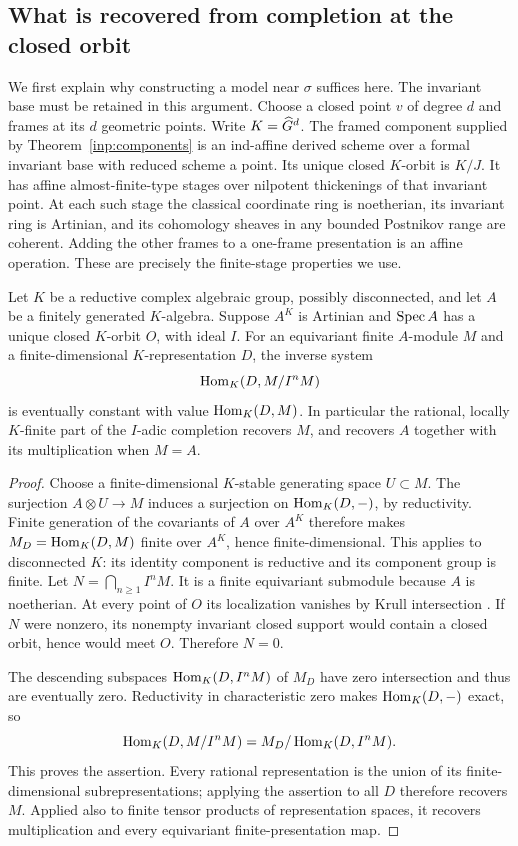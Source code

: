 \subsection{What is recovered from completion at the closed orbit}

We first explain why constructing a model near $\sigma$ suffices here.
The invariant base must be retained in this argument. Choose a closed
point $v$ of degree $d$ and frames at its $d$ geometric points. Write
$K=\widehat G^d$. The framed component supplied by
Theorem~\ref{inp:components} is an ind-affine derived scheme over a
formal invariant base with reduced scheme a point. Its unique closed
$K$-orbit is $K/J$. It has affine almost-finite-type stages over
nilpotent thickenings of that invariant point. At each such stage the
classical coordinate ring is noetherian, its invariant ring is
Artinian, and its cohomology sheaves in any bounded Postnikov range are
coherent. Adding the other frames to a one-frame presentation is an
affine operation. These are precisely the finite-stage properties we
use.

\begin{lemma}
\label{mod:finite-covariants}
Let $K$ be a reductive complex algebraic group, possibly disconnected,
and let $A$ be a finitely generated $K$-algebra. Suppose $A^K$ is
Artinian and $\operatorname{Spec} A$ has a unique closed $K$-orbit $O$, with ideal
$I$. For an equivariant finite $A$-module $M$ and a finite-dimensional
$K$-representation $D$, the inverse system
\[
 \operatorname{Hom}_K(D,M/I^nM)
\]
is eventually constant with value $\operatorname{Hom}_K(D,M)$. In particular the
rational, locally $K$-finite part of the $I$-adic completion recovers
$M$, and recovers $A$ together with its multiplication when $M=A$.
\end{lemma}

\begin{proof}
Choose a finite-dimensional $K$-stable generating space $U\subset M$.
The surjection $A\otimes U\to M$ induces a surjection on
$\operatorname{Hom}_K(D,-)$, by reductivity. Finite generation of the covariants
of $A$ over $A^K$ \cite[Lemma~2.3]{Brion} therefore makes
$M_D=\operatorname{Hom}_K(D,M)$ finite over $A^K$, hence finite-dimensional.
This applies to disconnected $K$: its identity component is reductive
and its component group is finite. Let $N=\bigcap_{n\geq1}I^nM$. It is a finite
equivariant submodule because $A$ is noetherian. At every point of $O$
its localization vanishes by Krull intersection \cite[Tag~00IP]{Stacks}. If $N$ were nonzero,
its nonempty invariant closed support would contain a closed orbit,
hence would meet $O$. Therefore $N=0$.

The descending subspaces $\operatorname{Hom}_K(D,I^nM)$ of $M_D$ have zero
intersection and thus are eventually zero. Reductivity in
characteristic zero makes $\operatorname{Hom}_K(D,-)$ exact, so
\[
 \operatorname{Hom}_K(D,M/I^nM)
 =M_D/\operatorname{Hom}_K(D,I^nM).
\]
This proves the assertion. Every rational representation is the union
of its finite-dimensional subrepresentations; applying the assertion
to all $D$ therefore recovers $M$. Applied also to finite tensor
products of representation spaces, it recovers multiplication and
every equivariant finite-presentation map.
\end{proof}

